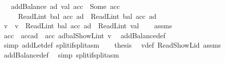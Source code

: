 \begin{isabellebody}
\ \ \ {\isachardoublequoteopen}addBalance\ ad\ val\ acc\ {\isacharequal}{\kern0pt}\ Some\ acc{\isacharprime}{\kern0pt}{\isachardoublequoteclose}\isanewline
\ \ \ \ \ {\isachardoublequoteopen}ReadL\isactrlsub i\isactrlsub n\isactrlsub t\ {\isacharparenleft}{\kern0pt}bal\ {\isacharparenleft}{\kern0pt}acc{\isacharprime}{\kern0pt}\ ad{\isacharparenright}{\kern0pt}{\isacharparenright}{\kern0pt}\ {\isasymge}\ ReadL\isactrlsub i\isactrlsub n\isactrlsub t\ {\isacharparenleft}{\kern0pt}bal\ {\isacharparenleft}{\kern0pt}acc\ ad{\isacharparenright}{\kern0pt}{\isacharparenright}{\kern0pt}{\isachardoublequoteclose}\isanewline
%
\isadelimproof
%
\endisadelimproof
%
\isatagproof
{}\isamarkupfalse%
\ {\isacharminus}{\kern0pt}\isanewline
\ \ \isamarkupfalse%
\ v\ \ {\isachardoublequoteopen}v\ {\isacharequal}{\kern0pt}\ ReadL\isactrlsub i\isactrlsub n\isactrlsub t\ {\isacharparenleft}{\kern0pt}bal\ {\isacharparenleft}{\kern0pt}acc\ ad{\isacharparenright}{\kern0pt}{\isacharparenright}{\kern0pt}\ {\isacharplus}{\kern0pt}\ ReadL\isactrlsub i\isactrlsub n\isactrlsub t\ val{\isachardoublequoteclose}\isanewline
\ \ \isamarkupfalse%
\ assms\ \isamarkupfalse%
\ {\isachardoublequoteopen}acc{\isacharprime}{\kern0pt}\ {\isacharequal}{\kern0pt}\ acc{\isacharparenleft}{\kern0pt}ad\ {\isacharcolon}{\kern0pt}{\isacharequal}{\kern0pt}\ acc\ ad{\isasymlparr}bal{\isacharcolon}{\kern0pt}{\isacharequal}{\kern0pt}ShowL\isactrlsub i\isactrlsub n\isactrlsub t\ v{\isasymrparr}{\isacharparenright}{\kern0pt}{\isachardoublequoteclose}\ \isamarkupfalse%
\ addBalance{\isacharunderscore}{\kern0pt}def\ \isamarkupfalse%
\ {\isacharparenleft}{\kern0pt}simp\ add{\isacharcolon}{\kern0pt}Let{\isacharunderscore}{\kern0pt}def\ split{\isacharcolon}{\kern0pt}if{\isacharunderscore}{\kern0pt}split{\isacharunderscore}{\kern0pt}asm{\isacharparenright}{\kern0pt}\isanewline
\ \ \isamarkupfalse%
\ {\isacharquery}{\kern0pt}thesis\ \isamarkupfalse%
\ v{\isacharunderscore}{\kern0pt}def\ Read{\isacharunderscore}{\kern0pt}ShowL{\isacharunderscore}{\kern0pt}id\ assms\ \isamarkupfalse%
\ addBalance{\isacharunderscore}{\kern0pt}def\ \isamarkupfalse%
\ {\isacharparenleft}{\kern0pt}simp\ split{\isacharcolon}{\kern0pt}if{\isacharunderscore}{\kern0pt}split{\isacharunderscore}{\kern0pt}asm{\isacharparenright}{\kern0pt}\isanewline
{}\isamarkupfalse%
%
\endisatagproof
{\isafoldproof}%
%
\isadelimproof

\end{isabellebody}
